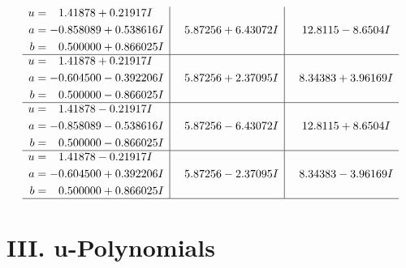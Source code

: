 \documentclass[1p]{elsarticle_modified}
\theoremstyle{definition}
\begin{document}
$$\begin{array}{c|c|c}
\begin{aligned}
u &= \phantom{-}1.41878 + 0.21917 I \\
a &= -0.858089 + 0.538616 I \\
b &= \phantom{-}0.500000 + 0.866025 I\end{aligned}
 & \phantom{-}5.87256 + 6.43072 I & \phantom{-}12.8115 - 8.6504 I \\ \hline\begin{aligned}
u &= \phantom{-}1.41878 + 0.21917 I \\
a &= -0.604500 - 0.392206 I \\
b &= \phantom{-}0.500000 - 0.866025 I\end{aligned}
 & \phantom{-}5.87256 + 2.37095 I & \phantom{-}8.34383 + 3.96169 I \\ \hline\begin{aligned}
u &= \phantom{-}1.41878 - 0.21917 I \\
a &= -0.858089 - 0.538616 I \\
b &= \phantom{-}0.500000 - 0.866025 I\end{aligned}
 & \phantom{-}5.87256 - 6.43072 I & \phantom{-}12.8115 + 8.6504 I \\ \hline\begin{aligned}
u &= \phantom{-}1.41878 - 0.21917 I \\
a &= -0.604500 + 0.392206 I \\
b &= \phantom{-}0.500000 + 0.866025 I\end{aligned}
 & \phantom{-}5.87256 - 2.37095 I & \phantom{-}8.34383 - 3.96169 I\\
 \hline 
 \end{array}$$\newpage
\newpage\renewcommand{\arraystretch}{1}
\centering \section*{ III. u-Polynomials}
\end{document}
